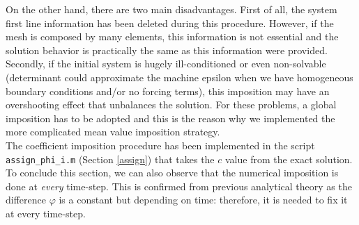 \documentclass[a4paper,11pt]{article}
\begin{document}
\noindent On the other hand, there are two main disadvantages. First of all, the system first line information has been deleted during this procedure. However, if the mesh is composed by many elements, this information is not essential and the solution behavior is practically the same as this information were provided. \\
Secondly, if the initial system is hugely ill-conditioned or even non-solvable (determinant could approximate the machine epsilon when we have homogeneous boundary conditions and/or no forcing terms), this imposition may have an overshooting effect that unbalances the solution. For these problems, a global imposition has to be adopted and this is the reason why we implemented the more complicated mean value imposition strategy.\\

\noindent The coefficient imposition procedure has been implemented in the script \texttt{assign\_phi\_i.m} (Section \ref{assign}) that takes the $c$ value from the exact solution.\\
\noindent To conclude this section, we can also observe that the numerical imposition is done at \emph{every} time-step. This is confirmed from previous analytical theory as the difference $\varphi$ is a constant but depending on time: therefore, it is needed to fix it at every time-step.
\end{document}
